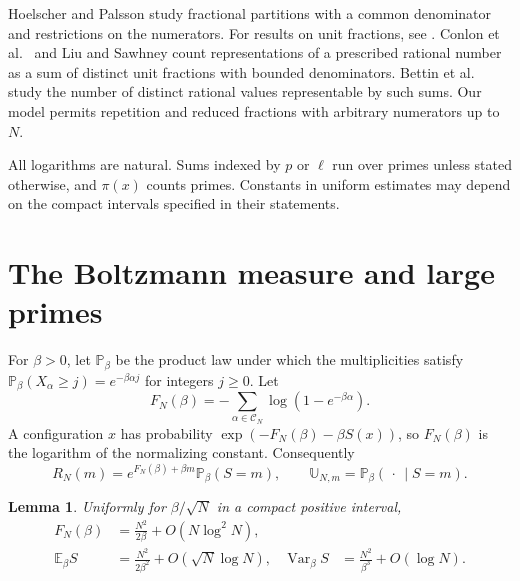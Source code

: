 \documentclass[11pt]{amsart}
\newtheorem{lemma}[theorem]{Lemma}
\theoremstyle{remark}
\DeclareMathOperator{\Var}{Var}
\newcommand{\Pp}{\mathbb P}
\newcommand{\Ee}{\mathbb E}
\newcommand{\CN}{\mathcal C_N}
\begin{document}
Hoelscher and Palsson \cite{hoelscher-palsson} study fractional partitions with a common denominator and restrictions on the numerators. For results on unit fractions, see \cite{croot,bloom,bloom-elsholtz}. Conlon et al.\ \cite{conlon-et-al} and Liu and Sawhney \cite{liu-sawhney} count representations of a prescribed rational number as a sum of distinct unit fractions with bounded denominators. Bettin et al.\ \cite{bettin-et-al} study the number of distinct rational values representable by such sums. Our model permits repetition and reduced fractions with arbitrary numerators up to \(N\).

All logarithms are natural. Sums indexed by \(p\) or \(\ell\) run over primes unless stated otherwise, and \(\pi(x)\) counts primes. Constants in uniform estimates may depend on the compact intervals specified in their statements.



\section{The Boltzmann measure and large primes}
\label{sec:boltzmann}

For \(\beta>0\), let \(\mathbb P_\beta\) be the product law under which the multiplicities satisfy
\(\Pp_\beta(X_\alpha\ge j)=e^{-\beta\alpha j}\) for integers \(j\ge0\). Let
\[
 F_N(\beta)=-\sum_{\alpha\in\CN}\log(1-e^{-\beta\alpha}).
\]
A configuration \(x\) has probability \(\exp(-F_N(\beta)-\beta S(x))\), so \(F_N(\beta)\) is the logarithm of the normalizing constant. Consequently
\begin{equation}
 R_N(m)=e^{F_N(\beta)+\beta m}\Pp_\beta(S=m),
 \qquad \mathbb U_{N,m}=\Pp_\beta(\,\cdot\,\mid S=m).
 \label{eq:boltzmann}
\end{equation}

\begin{lemma}
\label{lem:bulk}
Uniformly for \(\beta/\sqrt N\) in a compact positive interval,
\begin{align*}
 F_N(\beta)&=\frac{N^2}{2\beta}+O(N\log^2 N),\\
 \Ee_\beta S&=\frac{N^2}{2\beta^2}+O(\sqrt N\log N),&
 \Var_\beta S&=\frac{N^2}{\beta^3}+O(\log N).
\end{align*}
\end{lemma}
\end{document}
